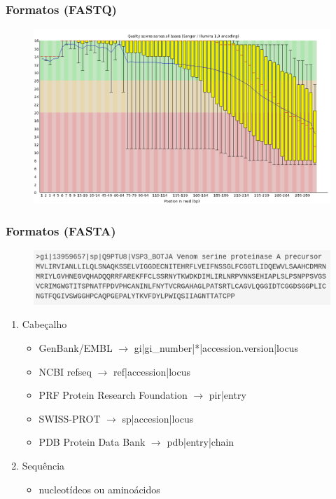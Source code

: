 \documentclass{beamer}
\begin{document}
	\begin{frame}\frametitle{Formatos (FASTQ)}
		\begin{figure}[ht]
		\centering
		\includegraphics[width=\textwidth]{img/antes}
		\end{figure}
	\end{frame}
	\begin{frame}\frametitle{Formatos (FASTA)}
		\begin{figure}[ht]
		\centering
		\includegraphics[width=\textwidth]{img/fasta.png}
		\end{figure}
		\begin{tiny}
		\begin{enumerate}
		\item Cabeçalho
		\begin{itemize}
			\item GenBank/EMBL $\rightarrow$ gi|gi\_number|*|accession.version|locus
			\item NCBI refseq $\rightarrow$ ref|accession|locus
			\item PRF Protein Research Foundation $\rightarrow$	pir|entry
			\item SWISS-PROT $\rightarrow$ sp|accesion|locus
			\item PDB Protein Data Bank $\rightarrow$ pdb|entry|chain
		\end{itemize}
		\item Sequência
		\begin{itemize}
			\item nucleotídeos ou aminoácidos
		\end{itemize}
		\end{enumerate}
		\end{tiny}
	\end{frame}
\end{document}

